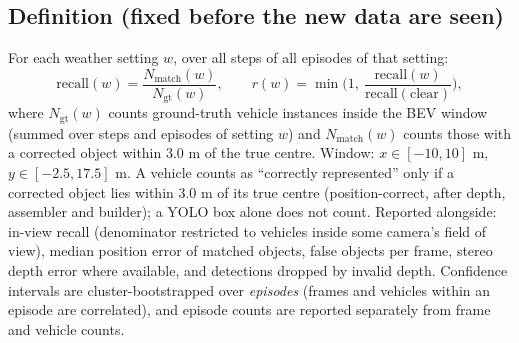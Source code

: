 \documentclass[11pt,a4paper]{article}
\begin{document}
\subsection{Definition (fixed before the new data are seen)}
For each weather setting $w$, over all steps of all episodes of that setting:
\[
\text{recall}(w)=\frac{N_{\text{match}}(w)}{N_{\text{gt}}(w)},\qquad
r(w)=\min\!\Big(1,\ \frac{\text{recall}(w)}{\text{recall}(\text{clear})}\Big),
\]
where $N_{\text{gt}}(w)$ counts ground-truth vehicle instances inside the BEV window (summed over steps and episodes of setting $w$) and $N_{\text{match}}(w)$ counts those with a corrected object within 3.0 m of the true centre.
Window: $x\in[-10,10]$ m, $y\in[-2.5,17.5]$ m. A vehicle counts as ``correctly represented'' only if a corrected object lies within 3.0 m of its true centre (position-correct, after depth, assembler and builder); a YOLO box alone does not count. Reported alongside: in-view recall (denominator restricted to vehicles inside some camera's field of view), median position error of matched objects, false objects per frame, stereo depth error where available, and detections dropped by invalid depth. Confidence intervals are cluster-bootstrapped over \emph{episodes} (frames and vehicles within an episode are correlated), and episode counts are reported separately from frame and vehicle counts.
\end{document}
